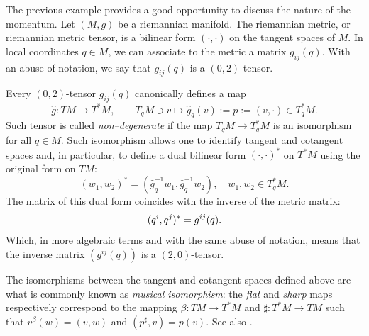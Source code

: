 \documentclass[english,fontsize=11pt,paper=a5,oneside]{scrbook}
\let\d\relax
\DeclareMathOperator{\d}{d}
\theoremstyle{definition}
\newenvironment{remark}
  {\pushQED{\qed}\renewcommand{\qedsymbol}{$\lozenge$}\remarkx}
  {\popQED\endremarkx}
\begin{document}
\begin{remark}\label{rem:ptocot}
The previous example provides a good opportunity to discuss the nature of the momentum.
Let $(M, g)$ be a riemannian manifold.
The riemannian metric, or riemannian metric tensor, is a bilinear form $(\cdot, \cdot)$ on the tangent spaces of $M$.
In local coordinates $q\in M$, we can associate to the metric a matrix $g_{ij}(q)$.
With an abuse of notation, we say that $g_{ij}(q)$ is a $(0,2)$-tensor.

Every $(0,2)$-tensor $g_{ij}(q)$ canonically defines a map
\begin{equation}
    \hat g: TM \to T^*M, \qquad T_q M \ni v \mapsto \hat g_q(v) := p := (v, \cdot) \in T^*_q M.
\end{equation}
Such tensor is called \emph{non--degenerate} if the map $T_qM \to T_q^* M$ is an isomorphism for all $q\in M$.
Such isomorphism allows one to identify tangent and cotangent spaces and, in particular, to define a dual bilinear form $(\cdot, \cdot)^*$ on $T^*M$ using the original form on $TM$:
\begin{equation}
    (w_1, w_2)^* = (\hat g_q^{-1} w_1, \hat g_q^{-1} w_2), \quad w_1,w_2 \in T^*_q M.
\end{equation}
The matrix of this dual form coincides with the inverse of the metric matrix:
\begin{equation}
    (\d q^i, \d q^j)^* = g^{ij}(q).
\end{equation}
Which, in more algebraic terms and with the same abuse of notation, means that the inverse matrix $(g^{ij}(q))$ is a $(2,0)$-tensor.

The isomorphisms between the tangent and cotangent spaces defined above are what is commonly known as \emph{musical isomorphism}: the \emph{flat} and \emph{sharp} maps respectively correspond to the mapping $\beta:TM\to T^*M$ and $\sharp:T^*M\to TM$ such that $v^\beta(w) = (v,w)$ and $(p^\sharp, v) = p(v)$. See also \cite[Chapter 11]{book:lee}.
\end{remark}
\end{document}
